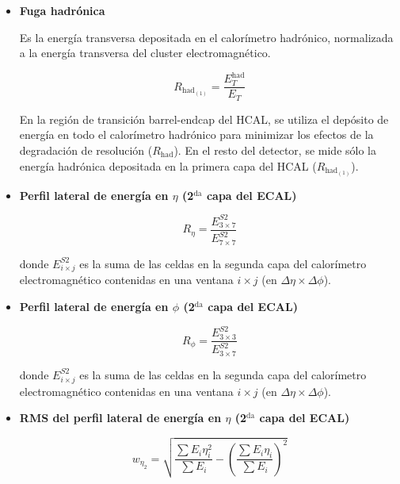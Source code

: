 \begin{itemize}

	\item \textbf{Fuga hadrónica}

		Es la energía transversa depositada en el calorímetro hadrónico, normalizada a la energía transversa del cluster electromagnético.

		\begin{equation}
		R_{\text{had}_{(1)}}=\frac{E_{T}^{\text{had}}}{E_{T}}
		\end{equation}

		En la región de transición barrel-endcap del HCAL, se utiliza el depósito de energía en todo el calorímetro hadrónico para minimizar los efectos de la degradación de resolución ($R_{\text{had}}$). En el resto del detector, se mide sólo la energía hadrónica depositada en la primera capa del HCAL ($R_{\text{had}_{(1)}}$).

	\item  \textbf{Perfil lateral de energía en $\eta$ (2$^{\text{da}}$ capa del ECAL)}

		\begin{equation}
		R_{\eta}=\frac{E_{3\times 7}^{S2}}{E_{7\times 7}^{S2}}
		\end{equation}

 		donde $E_{i\times j}^{S2}$ es la suma de las celdas en la segunda capa del calorímetro electromagnético contenidas en una ventana $i\times j$ (en $\Delta \eta \times \Delta \phi$).

	\item  \textbf{Perfil lateral de energía en $\phi$ (2$^{\text{da}}$ capa del ECAL)}

		\begin{equation}
		R_{\phi}=\frac{E_{3\times 3}^{S2}}{E_{3\times 7}^{S2}}
		\end{equation}

 		donde $E_{i\times j}^{S2}$ es la suma de las celdas en la segunda capa del calorímetro electromagnético contenidas en una ventana $i\times j$ (en $\Delta \eta \times \Delta \phi$).

	\item  \textbf{RMS del perfil lateral de energía en $\eta$ (2$^{\text{da}}$ capa del ECAL)}


		\begin{equation}
		w_{\eta_{2}}=\sqrt{\frac{\sum E_{i}\eta_{i}^{2}}{\sum E_{i}}- \left(\frac{\sum E_{i}\eta_{i}}{\sum E_{i}}\right)^{2}}
		\end{equation}


\end{itemize}
